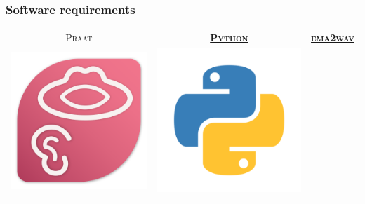 \documentclass[12pt,a4paper]{beamer}
\begin{document}
\begin{frame}
    \frametitle{Software requirements}
    \centering
    \begin{tabular}{ccc}
        \textsc{Praat} & \href{https://www.python.org/}{\textbf{\textsc{Python}}} & \href{https://github.com/phbuech/ema2wav}{\textbf{\textsc{ema2wav}}} \\
        \includegraphics[scale=0.75]{../pictures/Praat_logo.png} &
        \includegraphics[scale=0.75]{../pictures/Python_logo.png} &

\end{tabular}
\end{frame}
\end{document}
